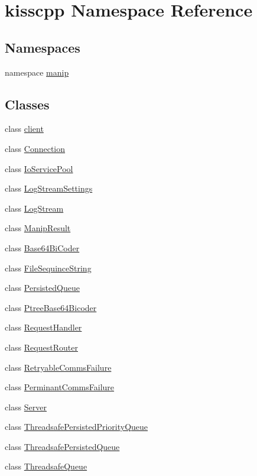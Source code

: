 \hypertarget{namespacekisscpp}{\section{kisscpp Namespace Reference}
\label{namespacekisscpp}
}
\subsection*{Namespaces}
\begin{DoxyCompactItemize}
\item 
namespace \hyperlink{namespacekisscpp_1_1manip}{manip}
\end{DoxyCompactItemize}
\subsection*{Classes}
\begin{DoxyCompactItemize}
\item 
class \hyperlink{classkisscpp_1_1client}{client}
\item 
class \hyperlink{classkisscpp_1_1_connection}{Connection}
\item 
class \hyperlink{classkisscpp_1_1_io_service_pool}{Io\-Service\-Pool}
\item 
class \hyperlink{classkisscpp_1_1_log_stream_settings}{Log\-Stream\-Settings}
\item 
class \hyperlink{classkisscpp_1_1_log_stream}{Log\-Stream}
\item 
class \hyperlink{classkisscpp_1_1_manip_result}{Manip\-Result}
\item 
class \hyperlink{classkisscpp_1_1_base64_bi_coder}{Base64\-Bi\-Coder}
\item 
class \hyperlink{classkisscpp_1_1_file_sequince_string}{File\-Sequince\-String}
\item 
class \hyperlink{classkisscpp_1_1_persisted_queue}{Persisted\-Queue}
\item 
class \hyperlink{classkisscpp_1_1_ptree_base64_bicoder}{Ptree\-Base64\-Bicoder}
\item 
class \hyperlink{classkisscpp_1_1_request_handler}{Request\-Handler}
\item 
class \hyperlink{classkisscpp_1_1_request_router}{Request\-Router}
\item 
class \hyperlink{classkisscpp_1_1_retryable_comms_failure}{Retryable\-Comms\-Failure}
\item 
class \hyperlink{classkisscpp_1_1_perminant_comms_failure}{Perminant\-Comms\-Failure}
\item 
class \hyperlink{classkisscpp_1_1_server}{Server}
\item 
class \hyperlink{classkisscpp_1_1_threadsafe_persisted_priority_queue}{Threadsafe\-Persisted\-Priority\-Queue}
\item 
class \hyperlink{classkisscpp_1_1_threadsafe_persisted_queue}{Threadsafe\-Persisted\-Queue}
\item 
class \hyperlink{classkisscpp_1_1_threadsafe_queue}{Threadsafe\-Queue}
\end{DoxyCompactItemize}
